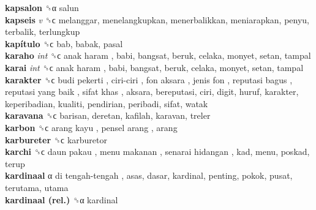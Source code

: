 \textbf{kapsalon} ␝α  salun  \\
\textbf{kapseis} \emph{v}  ␝ϲ  melanggar, menelangkupkan, menerbalikkan, meniarapkan, penyu, terbalik, terlungkup  \\
\textbf{kapítulo} ␝ϲ  bab, babak, pasal  \\
\textbf{karaho} \emph{int}  ␝ϲ   anak haram , babi, bangsat, beruk, celaka, monyet, setan, tampal  \\
\textbf{karai} \emph{int}  ␝ϲ   anak haram , babi, bangsat, beruk, celaka, monyet, setan, tampal  \\
\textbf{karakter} ␝ϲ   budi pekerti ,  ciri-ciri ,  fon aksara ,  jenis fon ,  reputasi bagus ,  reputasi yang baik ,  sifat khas , aksara, bereputasi, ciri, digit, huruf, karakter, keperibadian, kualiti, pendirian, peribadi, sifat, watak  \\
\textbf{karavana} ␝ϲ  barisan, deretan, kafilah, karavan, treler  \\
\textbf{karbon} ␝ϲ   arang kayu ,  pensel arang , arang  \\
\textbf{karbureter} ␝ϲ  karburetor  \\
\textbf{karchi} ␝ϲ   daun pakau ,  menu makanan ,  senarai hidangan , kad, menu, poskad, terup  \\
\textbf{kardinaal} α   di tengah-tengah , asas, dasar, kardinal, penting, pokok, pusat, terutama, utama  \\
\textbf{kardinaal (rel.)} ␝α  kardinal  \\
